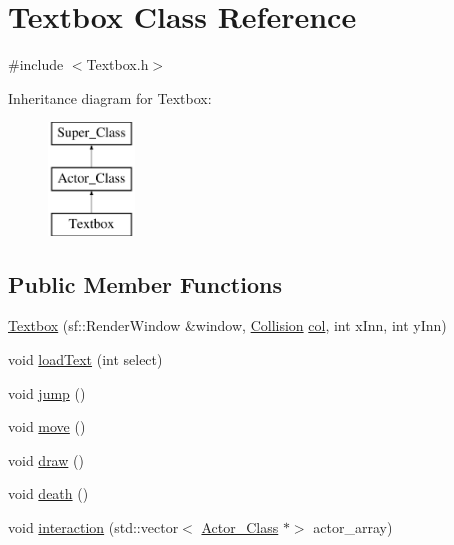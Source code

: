 \hypertarget{class_textbox}{}\section{Textbox Class Reference}
\label{class_textbox}


{\ttfamily \#include $<$Textbox.\+h$>$}

Inheritance diagram for Textbox\+:\begin{figure}[H]
\begin{center}
\leavevmode
\includegraphics[height=3.000000cm]{class_textbox}
\end{center}
\end{figure}
\subsection*{Public Member Functions}
\begin{DoxyCompactItemize}
\item 
\hyperlink{class_textbox_ada0c266e63758f57f6f9c88daed041bd}{Textbox} (sf\+::\+Render\+Window \&window, \hyperlink{class_collision}{Collision} \hyperlink{class_textbox_ad89bdee3ead7d89dca3e1ba1468c272c}{col}, int x\+Inn, int y\+Inn)
\item 
void \hyperlink{class_textbox_a0a58c0b828fb627bd21c8156d279e082}{load\+Text} (int select)
\item 
void \hyperlink{class_textbox_a995336eb1a269216afb4dcd187e39d0b}{jump} ()
\item 
void \hyperlink{class_textbox_a4680a3e6bbaa33dc57a585c7e0072b0a}{move} ()
\item 
void \hyperlink{class_textbox_a164e6dfbd1964b36b05de0cf84d07abf}{draw} ()
\item 
void \hyperlink{class_textbox_a830cca6316662b4c7a1ae1d2f844f9ae}{death} ()
\item 
void \hyperlink{class_textbox_a67dd5640da6bbd88affded4a37ede098}{interaction} (std\+::vector$<$ \hyperlink{class_actor___class}{Actor\+\_\+\+Class} $\ast$$>$ actor\+\_\+array)
\end{DoxyCompactItemize}
